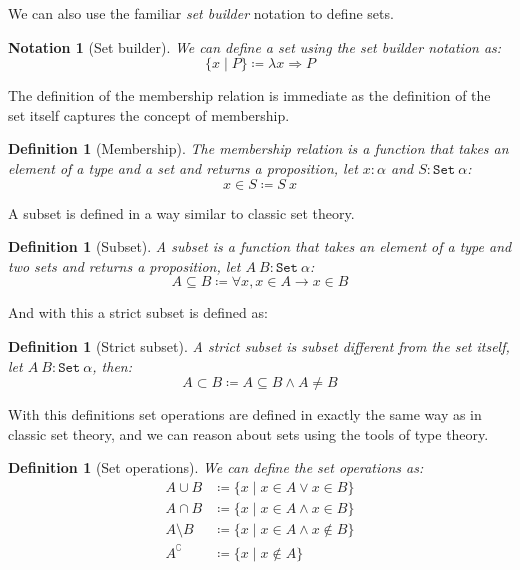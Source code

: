 \documentclass[
  a4paper, 
  10pt, 
  parskip=half, 
  DIV=20,
  toc=bibliography,
  usegeometry,
]{scrartcl}
\newtheorem{definition}[theorem]{Definition}
\newtheorem{notation}[theorem]{Notation}
\renewcommand{\implies}{\rightarrow}
\renewcommand{\mapsto}{\Rightarrow}
\begin{document}
We can also use the familiar \emph{set builder} notation to define sets.
\begin{notation}[Set builder]
  We can define a set using the set builder notation as:
  \[
  \{x \mid P\} \coloneqq \lambda x \mapsto P 
  \]
\end{notation}

The definition of the membership relation is immediate as the definition of the
set itself captures the concept of membership.

\begin{definition}[Membership]
  The membership relation is a function that takes an element of a type and a set
  and returns a proposition, let \(x: \alpha\) and \(S: \texttt{Set} \ \alpha\):
  \[
  x \in S \coloneqq S \ x 
  \]
\end{definition}

A subset is defined in a way similar to classic set theory.

\begin{definition}[Subset]
  A subset is a function that takes an element of a type and two sets and returns
  a proposition, let \(A \ B: \texttt{Set} \ \alpha\):
  \[
  A \subseteq B \coloneqq \forall x, x \in A \implies x \in B 
  \]
\end{definition}

And with this a strict subset is defined as:

\begin{definition}[Strict subset]
  A strict subset is subset different from the set itself, let
  \(A \ B: \texttt{Set} \ \alpha\), then:
  \[
  A \subset B \coloneqq A \subseteq B \land A \neq B
  \]
\end{definition}

With this definitions set operations are defined in exactly the same way as in
classic set theory, and we can reason about sets using the tools of type theory.

\begin{definition}[Set operations]
  We can define the set operations as:
  \begin{align*}
    A \cup B & \coloneqq \{x \mid x \in A \lor x \in B\} \\
    A \cap B & \coloneqq \{x \mid x \in A \land x \in B\} \\
    A \setminus B & \coloneqq \{x \mid x \in A \land x \notin B\} \\
    A^\complement & \coloneqq \{x \mid x \notin A\} 
  \end{align*}
\end{definition}
\end{document}
